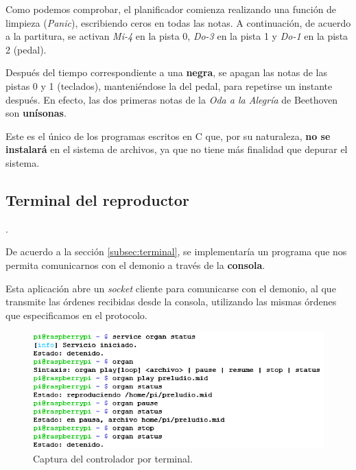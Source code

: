 \smallskip

Como podemos comprobar, el planificador comienza realizando una función de limpieza (\textit{Panic}), escribiendo ceros en todas las notas. A continuación, de acuerdo a la partitura, se activan \textit{Mi-4} en la pista 0, \textit{Do-3} en la pista 1 y \textit{Do-1} en la pista 2 (pedal).

Después del tiempo correspondiente a una \textbf{negra}, se apagan las notas de las pistas 0 y 1 (teclados), manteniéndose la del pedal, para repetirse un instante después. En efecto, las dos primeras notas de la \textit{Oda a la Alegría} de Beethoven son \textbf{unísonas}.

Este es el único de los programas escritos en C que, por su naturaleza, \textbf{no se instalará} en el sistema de archivos, ya que no tiene más finalidad que depurar el sistema.

\subsection{Terminal del reproductor}.

De acuerdo a la sección \ref{subsec:terminal}, se implementaría un programa que nos permita comunicarnos con el demonio a través de la \textbf{consola}.

Esta aplicación abre un \textit{socket} cliente para comunicarse con el demonio, al que transmite las órdenes recibidas desde la consola, utilizando las mismas órdenes que especificamos en el protocolo.

\smallskip

\begin{figure}[H]
	\noindent \begin{centering}
		\includegraphics[width=\linewidth*3/4]{capitulo5/cap_terminal}
		\par\end{centering}
	\smallskip
	\caption{\label{fig:cap_terminal} Captura del controlador por terminal.}
\end{figure} 

